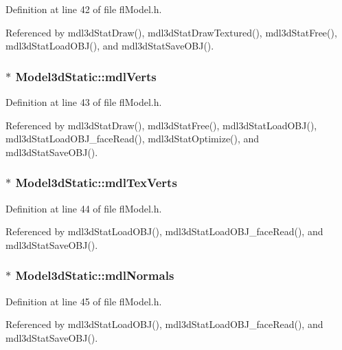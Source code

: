 Definition at line 42 of file fl\-Model.h.

Referenced by mdl3d\-Stat\-Draw(), mdl3d\-Stat\-Draw\-Textured(), mdl3d\-Stat\-Free(), mdl3d\-Stat\-Load\-OBJ(), and mdl3d\-Stat\-Save\-OBJ().
\subsubsection{$\ast$ {\bf Model3d\-Static::mdl\-Verts}}\label{structModel3dStatic_4173262ca9cef3a31e1cf3ef103b36d1}




Definition at line 43 of file fl\-Model.h.

Referenced by mdl3d\-Stat\-Draw(), mdl3d\-Stat\-Free(), mdl3d\-Stat\-Load\-OBJ(), mdl3d\-Stat\-Load\-OBJ\_\-face\-Read(), mdl3d\-Stat\-Optimize(), and mdl3d\-Stat\-Save\-OBJ().
\subsubsection{$\ast$ {\bf Model3d\-Static::mdl\-Tex\-Verts}}\label{structModel3dStatic_b1dd7b997d339624ad724ce8231c960d}




Definition at line 44 of file fl\-Model.h.

Referenced by mdl3d\-Stat\-Load\-OBJ(), mdl3d\-Stat\-Load\-OBJ\_\-face\-Read(), and mdl3d\-Stat\-Save\-OBJ().
\subsubsection{$\ast$ {\bf Model3d\-Static::mdl\-Normals}}\label{structModel3dStatic_ce76f5118207545e02b36281244fc75f}




Definition at line 45 of file fl\-Model.h.

Referenced by mdl3d\-Stat\-Load\-OBJ(), mdl3d\-Stat\-Load\-OBJ\_\-face\-Read(), and mdl3d\-Stat\-Save\-OBJ().
